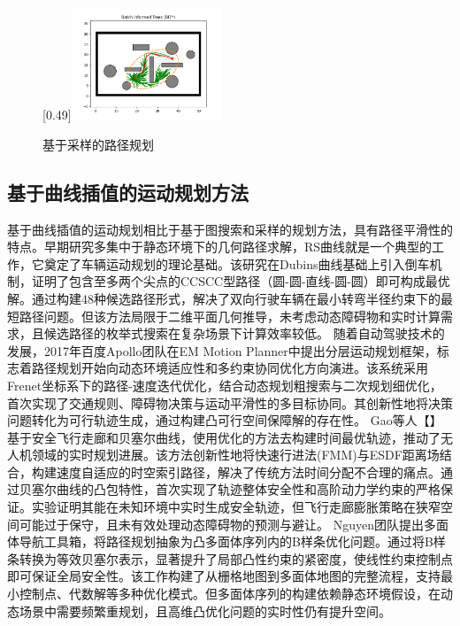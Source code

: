 \documentclass[master,academic]{ysuthesis} %
\begin{document}
\begin{figure}[!ht]
			[0.49\textwidth]{\includegraphics[width=0.4\textwidth]{插图/rrt/batch_informed_trees.png}}
			\caption{基于采样的路径规划}
			\label{fig:基于采样的路径规划}
		\end{figure}

		\subsection{基于曲线插值的运动规划方法}
		基于曲线插值的运动规划相比于基于图搜索和采样的规划方法，具有路径平滑性的特点。早期研究多集中于静态环境下的几何路径求解，RS曲线就是一个典型的工作，它奠定了车辆运动规划的理论基础。该研究在Dubins曲线基础上引入倒车机制，证明了包含至多两个尖点的CCSCC型路径（圆-圆-直线-圆-圆）即可构成最优解。通过构建48种候选路径形式，解决了双向行驶车辆在最小转弯半径约束下的最短路径问题。但该方法局限于二维平面几何推导，未考虑动态障碍物和实时计算需求，且候选路径的枚举式搜索在复杂场景下计算效率较低。 随着自动驾驶技术的发展，2017年百度Apollo团队在EM Motion Planner中提出分层运动规划框架，标志着路径规划开始向动态环境适应性和多约束协同优化方向演进。该系统采用Frenet坐标系下的路径-速度迭代优化，结合动态规划粗搜索与二次规划细优化，首次实现了交通规则、障碍物决策与运动平滑性的多目标协同。其创新性地将决策问题转化为可行轨迹生成，通过构建凸可行空间保障解的存在性。 Gao等人【】基于安全飞行走廊和贝塞尔曲线，使用优化的方法去构建时间最优轨迹，推动了无人机领域的实时规划进展。该方法创新性地将快速行进法(FMM)与ESDF距离场结合，构建速度自适应的时空索引路径，解决了传统方法时间分配不合理的痛点。通过贝塞尔曲线的凸包特性，首次实现了轨迹整体安全性和高阶动力学约束的严格保证。实验证明其能在未知环境中实时生成安全轨迹，但飞行走廊膨胀策略在狭窄空间可能过于保守，且未有效处理动态障碍物的预测与避让。 Nguyen团队提出多面体导航工具箱，将路径规划抽象为凸多面体序列内的B样条优化问题。通过将B样条转换为等效贝塞尔表示，显著提升了局部凸性约束的紧密度，使线性约束控制点即可保证全局安全性。该工作构建了从栅格地图到多面体地图的完整流程，支持最小控制点、代数解等多种优化模式。但多面体序列的构建依赖静态环境假设，在动态场景中需要频繁重规划，且高维凸优化问题的实时性仍有提升空间。
\end{document}
